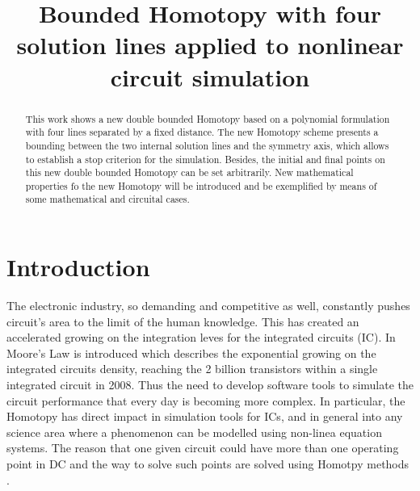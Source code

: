\documentclass[conference,letterpaper,onecolumn]{IEEEtran}
\begin{document}
\title{Bounded Homotopy with four solution lines applied to nonlinear circuit simulation}

\author{
\and
{}
\and
{}
\and
{}
}

\maketitle

\begin{abstract}

This work shows a new double bounded Homotopy based on a polynomial formulation with four lines separated by a fixed distance. The new Homotopy scheme presents a bounding between the two internal solution lines and the symmetry axis, which allows to establish a stop criterion for the simulation. Besides, the initial and final points on this new double bounded Homotopy can be set arbitrarily. New mathematical properties fo the new Homotopy will be introduced and be exemplified by means of some mathematical and circuital cases.
\end{abstract}
 
\section{Introduction}

The electronic industry, so demanding and competitive as well, constantly pushes circuit's area to the limit of the human knowledge. This has created an accelerated growing on the integration leves for the integrated circuits (IC). In \cite{lmoore} Moore's Law is introduced which describes the exponential growing on the integrated circuits density, reaching the 2 billion transistors within a single integrated circuit in 2008. Thus the need to develop software tools to simulate the circuit performance that every day is becoming more complex. In particular, the Homotopy has direct impact in simulation tools for ICs, and in general into any science area where a phenomenon can be modelled using non-linea equation systems. The reason that one given circuit could have more than one operating point in DC and the way to solve such points are solved using Homotpy methods \cite{homo_ogrodzki}.
\end{document}
